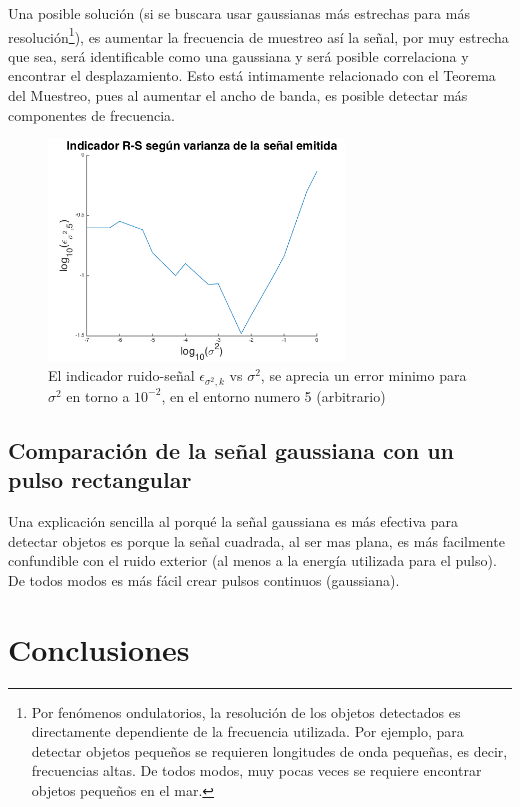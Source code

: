 \documentclass[letterpaper,11pt]{article}
\begin{document}
Una posible solución (si se buscara usar gaussianas más estrechas para más resolución\footnote{Por fenómenos ondulatorios, la resolución de los objetos detectados es directamente dependiente de la frecuencia utilizada. Por ejemplo, para detectar objetos pequeños se requieren longitudes de onda pequeñas, es decir, frecuencias altas. De todos modos, muy pocas veces se requiere encontrar objetos pequeños en el mar.}), es aumentar la frecuencia de muestreo así la señal, por muy estrecha que sea, será identificable como una gaussiana y será posible correlaciona y encontrar el desplazamiento. Esto está intimamente relacionado con el Teorema del Muestreo, pues al aumentar el ancho de banda, es posible detectar más componentes de frecuencia. 




\begin{figure}[H]
\centering
\includegraphics[width=0.7\textwidth]{img/parte_d/curva2d5.png}
\caption{El indicador ruido-señal $\epsilon_{\sigma^2,k}$ vs $\sigma^2$, se aprecia un error minimo para $\sigma^2$ en torno a $10^{-2}$, en el entorno numero 5 (arbitrario)}
\label{optimo}
\end{figure}


\subsection{Comparación de la señal gaussiana con un pulso rectangular}

Una explicación sencilla al porqué la señal gaussiana es más efectiva para detectar objetos es porque la señal cuadrada, al ser mas plana, es más facilmente confundible con el ruido exterior (al menos a la energía utilizada para el pulso). De todos modos es más fácil crear pulsos continuos (gaussiana).

\section{Conclusiones}
\end{document}
